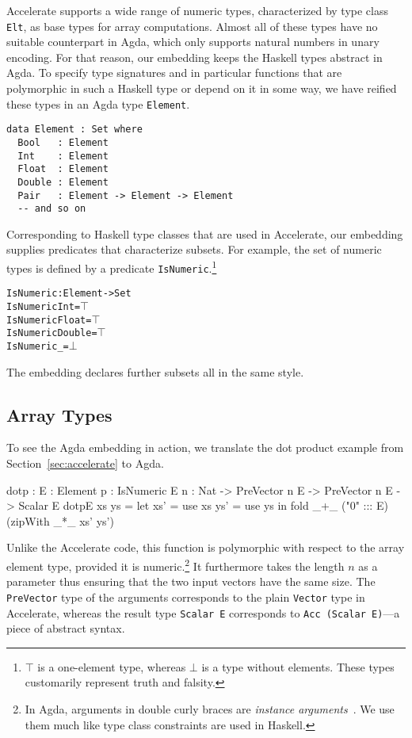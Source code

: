 \documentclass{llncs}
\begin{document}
Accelerate supports a wide range of numeric types, characterized by
type class \texttt{Elt}, as base types for
array computations. Almost all of these types have no suitable
counterpart in Agda, which only supports natural numbers in unary
encoding. For that reason, our embedding keeps the Haskell types
abstract in Agda. To specify type signatures and in particular
functions that are polymorphic in such a Haskell type or depend on it
in some way, we have reified these types in an Agda type
\texttt{Element}.
\begin{verbatim}
data Element : Set where
  Bool   : Element
  Int    : Element
  Float  : Element
  Double : Element
  Pair   : Element -> Element -> Element
  -- and so on
\end{verbatim}
Corresponding to Haskell type classes that are used in Accelerate, our
embedding supplies predicates that characterize subsets. For example,
the set of numeric types is defined by a predicate
\texttt{IsNumeric}.\footnote{$\top$ is a one-element type,
  whereas $\bot$ is a type without elements. These types customarily
  represent truth and falsity.}
\begin{alltt}
IsNumeric : Element -> Set
IsNumeric Int = \(\top\)
IsNumeric Float = \(\top\)
IsNumeric Double = \(\top\)
IsNumeric _ = \(\bot\)
\end{alltt}
The embedding declares further subsets all in the same style.

\subsection{Array Types}
\label{sec:array-types}

To see the Agda embedding in action, we translate the
dot product example from Section~\ref{sec:accelerate} to Agda.
\begin{code}
dotp : {E : Element} {{p : IsNumeric E}} {n : Nat}
     -> PreVector n E -> PreVector n E -> Scalar E
dotp{E} xs ys = 
  let xs' = use xs
      ys' = use ys
  in
  fold _+_ ("0" ::: E) (zipWith _*_ xs' ys')
\end{code}
Unlike the Accelerate code, this function is polymorphic with respect
to the array element type, provided it is numeric.\footnote{In Agda, arguments in double curly braces are \emph{instance arguments}~\cite{DevriesePiessens2011}. We use them much like type class constraints are used in Haskell.} It furthermore
takes the length $n$ as a parameter thus ensuring that the two input
vectors have the same size. The \texttt{PreVector} type of the
arguments corresponds to the plain \texttt{Vector} type in Accelerate,
whereas the result type \texttt{Scalar E} corresponds to \texttt{Acc
  (Scalar E)}---a piece of abstract syntax. 
\end{document}
